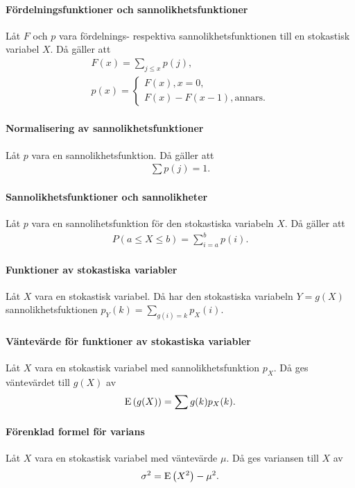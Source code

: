 \proof

\paragraph{Fördelningsfunktioner och sannolikhetsfunktioner}
Låt $F$ och $p$ vara fördelnings- respektiva sannolikhetsfunktionen till en stokastisk variabel $X$. Då gäller att
\begin{align*}
	F(x) = \sum\limits_{j\leq x}p(j), \\
	p(x) =
	\begin{cases}
		F(x), x = 0, \\
		F(x) - F(x - 1), \text{annars}.
	\end{cases}
\end{align*}

\proof

\paragraph{Normalisering av sannolikhetsfunktioner}
Låt $p$ vara en sannolikhetsfunktion. Då gäller att
\begin{align*}
	\sum p(j) = 1.
\end{align*}

\proof

\paragraph{Sannolikhetsfunktioner och sannolikheter}
Låt $p$ vara en sannolihetsfunktion för den stokastiska variabeln $X$. Då gäller att
\begin{align*}
	P(a\leq X\leq b) = \sum\limits_{i = a}^{b}p(i).
\end{align*}

\proof

\paragraph{Funktioner av stokastiska variabler}
Låt $X$ vara en stokastisk variabel. Då har den stokastiska variabeln $Y = g(X)$ sannolikhetsfuktionen $p_{Y}(k) = \sum\limits_{g(i) = k}p_{X}(i)$.

\proof

\paragraph{Väntevärde för funktioner av stokastiska variabler}
Låt $X$ vara en stokastisk variabel med sannolikhetsfunktion $p_{X}$. Då ges väntevärdet till $g(X)$ av
\begin{align*}
	\text{E}\left(g(X)\right) = \sum g(k)p_{X}(k).
\end{align*}

\proof

\paragraph{Förenklad formel för varians}
Låt $X$ vara en stokastisk variabel med väntevärde $\mu$. Då ges variansen till $X$ av
\begin{align*}
	\sigma^2 = \text{E}\left(X^2\right) - \mu^2.
\end{align*}

\proof